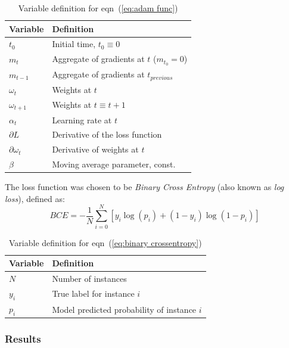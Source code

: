 \documentclass{mcmthesis}
\begin{document}
\begin{table}[ht]
\caption{Variable definition for eqn~(\ref{eq:adam func})}
\centering
\vspace{5pt}
\begin{tabular}{||l l||} 
 \hline
 Variable & Definition \\ [0.5ex] 
 \hline\hline
  $t_0$ & Initial time, $t_0\equiv 0$ \\ 
 \hline
 $m_t$ & Aggregate of gradients at $t$ ($m_{t_0}=0$) \\ 
 \hline
 $m_{t-1}$ & Aggregate of gradients at $t_{previous}$ \\
 \hline
 $\omega_{t}$ & Weights at $t$ \\
 \hline
 $\omega_{t+1}$ & Weights at $t\equiv t+1$ \\
 \hline
 $\alpha_t$ & Learning rate at $t$ \\
 \hline
 $\partial L$ & Derivative of the loss function \\
 \hline
 $\partial \omega_t$ & Derivative of weights at $t$ \\
 \hline
 $\beta$ & Moving average parameter, const. \\ [1ex] 
 \hline
\end{tabular}
\end{table}

The loss function was chosen to be \textit{Binary Cross Entropy} (also known as \textit{log loss}), defined as:
\begin{equation}\label{eq:binary crossentropy}
    BCE=-\frac{1}{N}\sum_{i=0}^{N}\left [y_i \log(p_i) +(1-y_i)\log(1-p_i)\right]
\end{equation}

\begin{table}[ht]
\caption{Variable definition for eqn~(\ref{eq:binary crossentropy})}
\centering
\vspace{5pt}
\begin{tabular}{||l l||} 
 \hline
 Variable & Definition \\ [0.5ex] 
 \hline\hline
  $N$ & Number of instances \\
 \hline
  $y_i$ & True label for instance $i$ \\ 
 \hline
 $p_i$ & Model predicted probability of instance $i$ \\ [1ex] 
 \hline
\end{tabular}
\end{table}

\subsubsection{Results}
\end{document}
